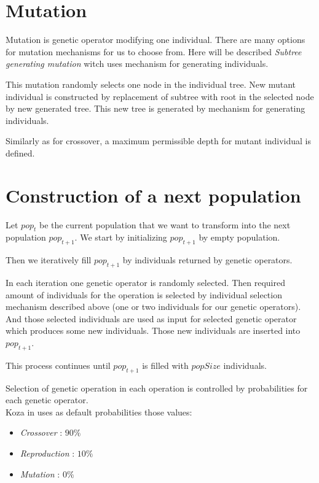 \documentclass[12pt,a4paper]{report}
\begin{document}
\section{Mutation}

Mutation is genetic operator modifying one individual.
There are many options for mutation mechanisms 
for us to choose from. Here will be described 
\textit{Subtree generating mutation} 
witch uses mechanism for generating individuals.

This mutation randomly selects one node in the individual tree.
New mutant individual is constructed by replacement of 
subtree with root in the selected node by new generated
tree. This new tree is generated by mechanism for generating 
individuals.

Similarly as for crossover, a maximum permissible depth for mutant individual 
is defined.


\section{Construction of a next population}

Let $pop_{t}$ be the current population that we want to 
transform into the next population $pop_{t+1}$. 
We start by initializing $pop_{t+1}$ by empty population.

Then we iteratively fill $pop_{t+1}$ by individuals 
returned by genetic operators.

In each iteration one genetic operator is randomly selected.
Then required amount of individuals for the operation is selected
by individual selection mechanism described above (one or two
individuals for our genetic operators).
And those selected individuals are used as input for selected
genetic operator which produces some new individuals.
Those new individuals are inserted into $pop_{t+1}$.

This process continues until $pop_{t+1}$ is filled with
$popSize$ individuals.  

Selection of genetic operation in each operation is 
controlled by probabilities for each genetic operator.\\

Koza in \cite{koza92} uses as default probabilities those values:

\begin{itemize}
	\item \textit{Crossover}    : $90\%$
	\item \textit{Reproduction} : $10\%$
	\item \textit{Mutation}     :  $0\%$
\end{itemize}
\end{document}
